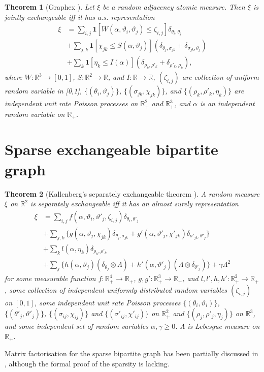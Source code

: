 \documentclass{article}
\newtheorem{theorem}{Theorem} %
\theoremstyle{definition}
\begin{document}
\begin{theorem}[Graphex \citep{Veitch2015}] Let $\xi$ be a random adjacency atomic measure. Then $\xi$ is jointly exchangeable iff it has a.s. representation
\begin{align}
\xi &= \sum_{i,j}\mathbf{1} [W(\alpha, \vartheta_i, \vartheta_j) \leq \zeta_{i,j}]\delta_{\theta_i, \theta_j} \\
&+\sum_{j,k} \mathbf{1} [\chi_{jk} \leq S(\alpha, \vartheta_j)](\delta_{\theta_j,\sigma_{jk}} +  \delta_{\sigma_{jk},\theta_j}) \\
&+\sum_{k} \mathbf{1} [\eta_{k} \leq I(\alpha)](\delta_{\rho_k,\rho'_k} + \delta_{\rho'_k, \rho_k}),
\end{align}
where $W:\mathbb{R}^3 \rightarrow [0,1]$, $S:\mathbb{R}^2 \rightarrow \mathbb{R}$, and $I:\mathbb{R}\rightarrow\mathbb{R}$, $(\zeta_{i,j})$ are collection of uniform random variable in [0,1], $\{(\theta_i, \vartheta_j)\}$, $\{(\sigma_{jk}, \chi_{jk})\}$, and $\{(\rho_k, \rho'_k, \eta_{k})\}$ are independent unit rate Poisson processes on $\mathbb{R}^2_+$ and $\mathbb{R}^3_+$, and $\alpha$ is an independent random variable on $\mathbb{R}_+$.
\end{theorem}

\section{Sparse exchangeable bipartite graph}

\begin{theorem}[Kallenberg's separately exchangeable theorem \citep{Kallenberg1990}] A random measure $\xi$ on $\mathbb{R}^2$ is separately exchangeable iff it has an almost surely representation
\begin{align}
\xi &= \sum_{i,j} f(\alpha, \vartheta_i, \vartheta'_j, \zeta_{i,j})\delta_{\theta_i, \theta'_j} \\
&+ \sum_{j,k}\{g(\alpha, \vartheta_j, \chi_{jk})\delta_{\theta_j,\sigma_{jk}} + g'(\alpha, \vartheta'_j, \chi'_{jk})\delta_{\sigma'_{jk},\theta'_j}\}\\
&+ \sum_{k}l(\alpha, \eta_k)\delta_{\rho_k,\rho'_k} \\
&+\sum_j\{h(\alpha, \vartheta_j)(\delta_{\theta_j} \otimes \Lambda) + h'(\alpha, \vartheta'_j)(\Lambda \otimes \delta_{\theta'_j})\} + \gamma \Lambda^2
\end{align}
for some measurable function $f:\mathbb{R}_+^4 \rightarrow \mathbb{R}_+$, $g,g':\mathbb{R}_+^3 \rightarrow \mathbb{R}_+$, and $l, l', h, h': \mathbb{R}_+^2\rightarrow\mathbb{R}_+$, some collection of independent uniformly distributed random variables $(\zeta_{i,j})$ on $[0,1]$, some independent unit rate Poisson processes $\{(\theta_i, \vartheta_i)\}$, $\{(\theta'_j, \vartheta'_j)\}$, $\{(\sigma_{ij}, \chi_{ij})\}$ and $\{(\sigma'_{ij}, \chi'_{ij})\}$ on $\mathbb{R}_+^2$ and $\{(\rho_j, \rho'_j, \eta_j)\}$ on $\mathbb{R}^3$, and some independent set of random variables $\alpha, \gamma \geq 0$. $\Lambda$ is Lebesgue measure on $\mathbb{R}_+$.
\end{theorem}
Matrix factorisation for the sparse bipartite graph has been partially discussed in \citep{Caron2012}, although the formal proof of the sparsity is lacking.



\end{document}
